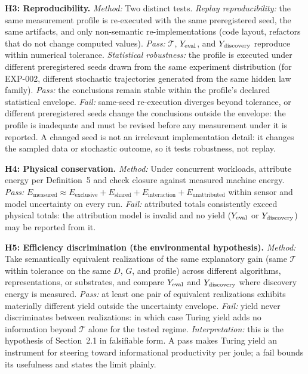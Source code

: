 \documentclass[11pt]{article}
\begin{document}
\textbf{H3: Reproducibility.} \textit{Method:} Two distinct tests. \textit{Replay reproducibility:} the same measurement profile is re-executed with the same preregistered seed, the same artifacts, and only non-semantic re-implementations (code layout, refactors that do not change computed values). \textit{Pass:} \(\mathcal{T}\), \(Y_{\rm eval}\), and \(Y_{\rm discovery}\) reproduce within numerical tolerance. \textit{Statistical robustness:} the profile is executed under different preregistered seeds drawn from the same experiment distribution (for EXP-002, different stochastic trajectories generated from the same hidden law family). \textit{Pass:} the conclusions remain stable within the profile's declared statistical envelope. \textit{Fail:} same-seed re-execution diverges beyond tolerance, or different preregistered seeds change the conclusions outside the envelope: the profile is inadequate and must be revised before any measurement under it is reported. A changed seed is not an irrelevant implementation detail: it changes the sampled data or stochastic outcome, so it tests robustness, not replay.

\textbf{H4: Physical conservation.} \textit{Method:} Under concurrent workloads, attribute energy per Definition~5 and check closure against measured machine energy. \textit{Pass:} \(E_{\text{measured}} \approx E_{\text{exclusive}} + E_{\text{shared}} + E_{\text{interaction}} + E_{\text{unattributed}}\) within sensor and model uncertainty on every run. \textit{Fail:} attributed totals consistently exceed physical totals: the attribution model is invalid and no yield (\(Y_{\rm eval}\) or \(Y_{\rm discovery}\)) may be reported from it.

\textbf{H5: Efficiency discrimination (the environmental hypothesis).} \textit{Method:} Take semantically equivalent realizations of the same explanatory gain (same \(\mathcal{T}\) within tolerance on the same \(D\), \(G\), and profile) across different algorithms, representations, or substrates, and compare \(Y_{\rm eval}\) and \(Y_{\rm discovery}\) where discovery energy is measured. \textit{Pass:} at least one pair of equivalent realizations exhibits materially different yield outside the uncertainty envelope. \textit{Fail:} yield never discriminates between realizations: in which case Turing yield adds no information beyond \(\mathcal{T}\) alone for the tested regime. \textit{Interpretation:} this is the hypothesis of Section~2.1 in falsifiable form. A pass makes Turing yield an instrument for steering toward informational productivity per joule; a fail bounds its usefulness and states the limit plainly.
\end{document}
